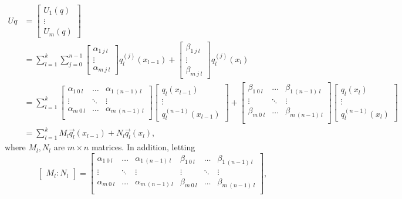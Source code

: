 \documentclass[10pt,reqno,oneside,a4paper]{article}
\begin{document}
\begin{align*}
Uq &= \begin{bmatrix} U_1(q) \\ \vdots \\U_m(q) \end{bmatrix} \\&= 
\sum^k_{l=1} \sum^{n-1}_{j=0} \begin{bmatrix} \alpha_{1~j~l}  \\ \vdots \\\alpha_{m~j~l}\end{bmatrix}  q_l^{(j)}(x_{l-1}) + \begin{bmatrix} \beta_{1~j~l} \\ \vdots \\\beta_{m~j~l}\end{bmatrix} q_l^{(j)}(x_{l}) \\
&= 
\sum^k_{l=1} 
\begin{bmatrix}
\alpha_{1~0~l}  & \ldots & \alpha_{1~(n-1)~l} \\
\vdots & \ddots & \vdots \\
\alpha_{m~0~l} &  \ldots & \alpha_{m~(n-1)~l} \\
\end{bmatrix}
\begin{bmatrix}
q_l(x_{l-1})  \\
\vdots \\
 q_l^{(n-1)}(x_{l-1})  
\end{bmatrix} + 
\begin{bmatrix}
\beta_{1~0~l} & \ldots & \beta_{1~(n-1)~l} \\
\vdots & \ddots & \vdots \\
\beta_{m~0~l} & \ldots & \beta_{m~(n-1)~l} \\
\end{bmatrix}
\begin{bmatrix}
q_l(x_l)  \\
\vdots \\
 q_l^{(n-1)}(x_l)  
\end{bmatrix} \\
&= \sum^k_{l=1} M_l \vec{q_l}(x_{l-1}) + N_l \vec{q_l}(x_l), \tag{$\dagger$}
\end{align*}
where $M_l, N_l$ are $m \times n$ matrices. In addition, letting 
\[ 
\begin{bmatrix}
M_l : N_l 
\end{bmatrix}
=
\begin{bmatrix}
\alpha_{1~0~l}  & \ldots & \alpha_{1~(n-1)~l} & \beta_{1~0~l} & \ldots & \beta_{1~(n-1)~l} \\
\vdots & \ddots & \vdots & \vdots & \ddots & \vdots \\
\alpha_{m~0~l} &  \ldots & \alpha_{m~(n-1)~l}  & \beta_{m~0~l} & \ldots & \beta_{m~(n-1)~l} \\
\end{bmatrix},
\]
\end{document}

